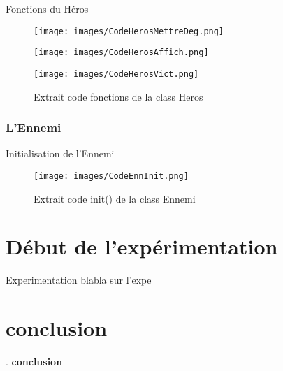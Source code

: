 \documentclass{beamer}
\begin{document}
\begin{frame}

	\begin{block}{Fonctions du Héros}

	\begin{figure}[h]
	\texttt{[image: images/CodeHerosMettreDeg.png]}
	\end{figure}

	\begin{figure}[h]
	\texttt{[image: images/CodeHerosAffich.png]}
	\end{figure}

	\begin{figure}[h]
	\texttt{[image: images/CodeHerosVict.png]}
	\caption{Extrait code fonctions de la class Heros}
	\end{figure}

	\end{block}

\end{frame}




\subsubsection{L'Ennemi}

\begin{frame}

	\begin{block}{Initialisation de l'Ennemi}

	\begin{figure}[h]
	\texttt{[image: images/CodeEnnInit.png]}
	\caption{Extrait code init() de la class Ennemi}
	\end{figure}

	\end{block}

\end{frame}




\section{Début de l’expérimentation }

\begin{frame}
\begin{block}{Experimentation }
	blabla sur l'expe
\end{block}
\end{frame}


\section{conclusion }

\begin{frame}

\begin{block}{.}
\textbf{conclusion}
\end{block}

\end{frame}
\end{document}
